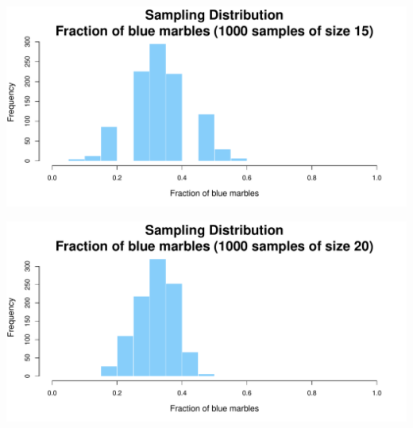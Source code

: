 \documentclass[aspectratio=169]{beamer}
\theoremstyle{principle}
\begin{document}
\begin{frame}
\begin{center}
\includegraphics[scale=0.57]{hist_1000_samples_15_size.pdf}
\end{center}
\end{frame}

\begin{frame}
\begin{center}
\includegraphics[scale=0.57]{hist_1000_samples_20_size.pdf}
\end{center}
\end{frame}
\end{document}
